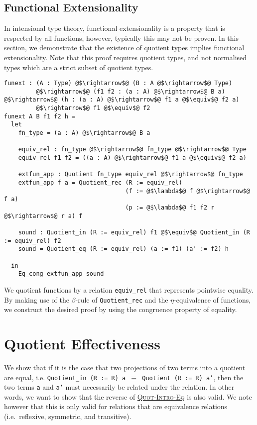 \documentclass[12pt,twoside,maitrise]{dms}
\theoremstyle{definition}
\numberwithin{equation}{section}
\numberwithin{table}{chapter}
\numberwithin{figure}{chapter}
\newcommand\id[1] {\texttt{#1}}
\newcommand\fn[1] {\texttt{#1}}
\begin{document}
\section{Functional Extensionality}\label{sec:quot-implies-funext}

In intensional type theory, functional extensionality is a property that is
respected by all functions, however, typically this may not be proven. In this
section, we demonstrate that the existence of quotient types implies functional
extensionality. Note that this proof requires quotient types, and not normalised
types which are a strict subset of quotient types.

\begin{verbatim}
funext : (A : Type) @$\rightarrow$@ (B : A @$\rightarrow$@ Type)
         @$\rightarrow$@ (f1 f2 : (a : A) @$\rightarrow$@ B a) @$\rightarrow$@ (h : (a : A) @$\rightarrow$@ f1 a @$\equiv$@ f2 a)
         @$\rightarrow$@ f1 @$\equiv$@ f2
funext A B f1 f2 h =
  let
    fn_type = (a : A) @$\rightarrow$@ B a

    equiv_rel : fn_type @$\rightarrow$@ fn_type @$\rightarrow$@ Type
    equiv_rel f1 f2 = ((a : A) @$\rightarrow$@ f1 a @$\equiv$@ f2 a)

    extfun_app : Quotient fn_type equiv_rel @$\rightarrow$@ fn_type
    extfun_app f a = Quotient_rec (R := equiv_rel)
                                  (f := @$\lambda$@ f @$\rightarrow$@ f a)
                                  (p := @$\lambda$@ f1 f2 r @$\rightarrow$@ r a) f

    sound : Quotient_in (R := equiv_rel) f1 @$\equiv$@ Quotient_in (R := equiv_rel) f2
    sound = Quotient_eq (R := equiv_rel) (a := f1) (a' := f2) h

  in
    Eq_cong extfun_app sound
\end{verbatim}

We quotient functions by a relation \id{equiv\_rel} that represents pointwise
equality. By making use of the $\beta$-rule of \id{Quotient\_rec} and the
$\eta$-equivalence of functions, we construct the desired proof by using the
congruence property of equality.

\chapter{Quotient Effectiveness}\label{ch:quotient-effectiveness}

We show that if it is the case that two projections of two terms into a quotient
are equal, i.e. \fn{Quotient_in (R := R) a $\equiv$ Quotient (R := R) a'}, then
the two terms \id{a} and \id{a'} must necessarily be related under the relation.
In other words, we want to show that the reverse of
\hyperref[quot-intro-eq-rule]{\textsc{Quot-Intro-Eq}} is also valid. We note
however that this is only valid for relations that are equivalence relations
(i.e.\ reflexive, symmetric, and transitive).
\end{document}
